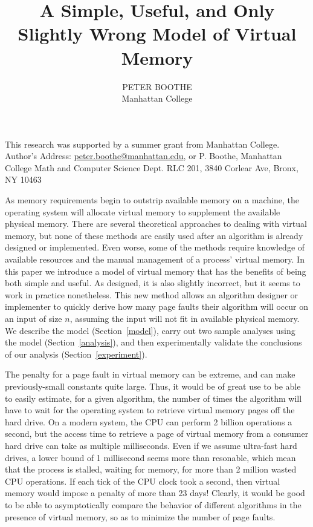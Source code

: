 \documentclass{acmtrans2m}
\title{A Simple, Useful, and Only Slightly Wrong Model of Virtual Memory}
\author{PETER BOOTHE\\
Manhattan College
}
\begin{document}
 
\begin{bottomstuff} 
This research was supported by a summer grant from Manhattan College.\\
Author's Address: \url{peter.boothe@manhattan.edu}, or P. Boothe, Manhattan College Math and Computer Science Dept. RLC 201, 3840 Corlear Ave, Bronx, NY 10463\\
\end{bottomstuff} 
\maketitle 


As memory requirements begin to outstrip available memory on a machine, the
operating system will allocate virtual memory to supplement the available
physical memory.  There are several theoretical approaches to dealing with
virtual memory, but none of these methods are easily used after an algorithm is
already designed or implemented.  Even worse, some of the methods require
knowledge of available resources and the manual management of a process'
virtual memory.  In this paper we introduce a model of virtual memory that has
the benefits of being both simple and useful.  As designed, it is also slightly
incorrect, but it seems to work in practice nonetheless.  This new method
allows an algorithm designer or implementer to quickly derive how many page
faults their algorithm will occur on an input of size $n$, assuming the input
will not fit in available physical memory.  We describe the model
(Section~\ref{model}), carry out two sample analyses using the model
(Section~\ref{analysis}), and then experimentally validate the conclusions of
our analysis (Section~\ref{experiment}).

 The
penalty for a page fault in virtual memory can be extreme, and can make
previously-small constants quite large. Thus, it would be of great use to be
able to easily estimate, for a given algorithm, the number of times the
algorithm will have to wait for the operating system to retrieve virtual memory
pages off the hard drive.  On a modern system, the CPU can perform 2 billion operations a second, but the access time to retrieve a page of virtual memory from a consumer hard drive can take as multiple milliseconds.  Even if we assume ultra-fast hard drives, a lower bound of 1 millisecond seems more than resonable, which mean that the process is stalled, waiting for memory, for more than 2 million wasted CPU operations.  If each tick of the CPU clock took a second, then virtual memory would impose a penalty of more than 23 days!  Clearly, it would be good to be able to asymptotically compare the behavior of different algorithms in the presence of virtual memory, so as to minimize the number of page faults.
\end{document}
